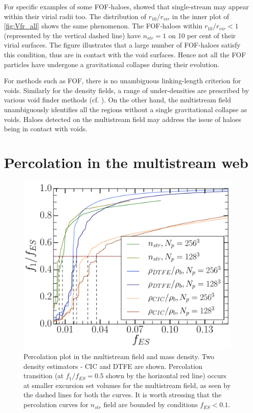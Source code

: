 \documentclass[fleqn,usenatbib,useAMS]{mnras}
\newcommand\hl{\bgroup\markoverwith
  {\textcolor{yellow}{\rule[-.5ex]{2pt}{2.5ex}}}\ULon}
\begin{document}
For specific examples of some FOF-haloes, \cite{Ramachandra2015} showed that single-stream may appear within their virial radii too. The distribution of $r_{10}/r_{vir}$ in the inner plot of \autoref{fig:Vfr_all} shows the same phenomenon. The FOF-haloes within $r_{10}/r_{vir} < 1$ (represented by the vertical dashed line) have $n_{str} = 1$ on 10 per cent of their virial surfaces. The figure illustrates that a large number of FOF-haloes satisfy this condition, thus are in contact with the void surfaces. Hence not all the FOF particles have undergone a gravitational collapse during their evolution. 


For methods such as FOF, there is no unambiguous linking-length criterion for voids. Similarly for the density fields, a range of under-densities are prescribed by various void finder methods (cf. \citealt{Colberg2008}). On the other hand, the multistream field unambiguously identifies all the regions without a single gravitational collapse as voids. Haloes detected on the multistream field may address the issue of haloes being in contact with voids. 

\section{Percolation in the multistream web}
\label{sec:percolation}

\begin{figure}
\begin{minipage}[t]{.99\linewidth}
  \centering\includegraphics[width=8.cm]{fig4.pdf} 
\end{minipage}\hfill
\caption{Percolation plot in the multistream field and mass density. Two density estimators - CIC and DTFE are shown. Percolation transition (at $f_1/f_{ES} = 0.5$ shown by the horizontal red line) occurs at smaller excursion set volumes for the multistream field, as seen by the dashed lines for both the curves. It is worth stressing that the percolation curves for $n_{str}$ field are bounded by conditions $f_{ES} < 0.1$. }
\label{fig:PercTh}
\end{figure}
\end{document}
